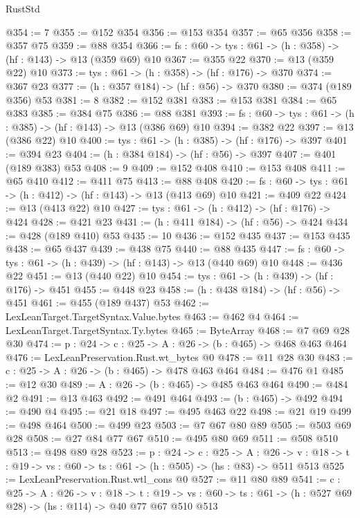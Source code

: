 \begin{lexlean}{RustStd}
\begin{coremodule}
@354 := 7
@355 := @152 @354
@356 := @153 @354
@357 := @65 @356
@358 := @357 @75
@359 := @88 @354
@366 := {fs : @60} -> {tys : @61} -> (h : @358) -> (hf : @143) -> @13 (@359 @69) @10
@367 := @355 @22
@370 := @13 (@359 @22) @10
@373 := {tys : @61} -> (h : @358) -> (hf : @176) -> @370
@374 := @367 @23
@377 := (h : @357 @184) -> (hf : @56) -> @370
@380 := @374 (@189 @356) @53
@381 := 8
@382 := @152 @381
@383 := @153 @381
@384 := @65 @383
@385 := @384 @75
@386 := @88 @381
@393 := {fs : @60} -> {tys : @61} -> (h : @385) -> (hf : @143) -> @13 (@386 @69) @10
@394 := @382 @22
@397 := @13 (@386 @22) @10
@400 := {tys : @61} -> (h : @385) -> (hf : @176) -> @397
@401 := @394 @23
@404 := (h : @384 @184) -> (hf : @56) -> @397
@407 := @401 (@189 @383) @53
@408 := 9
@409 := @152 @408
@410 := @153 @408
@411 := @65 @410
@412 := @411 @75
@413 := @88 @408
@420 := {fs : @60} -> {tys : @61} -> (h : @412) -> (hf : @143) -> @13 (@413 @69) @10
@421 := @409 @22
@424 := @13 (@413 @22) @10
@427 := {tys : @61} -> (h : @412) -> (hf : @176) -> @424
@428 := @421 @23
@431 := (h : @411 @184) -> (hf : @56) -> @424
@434 := @428 (@189 @410) @53
@435 := 10
@436 := @152 @435
@437 := @153 @435
@438 := @65 @437
@439 := @438 @75
@440 := @88 @435
@447 := {fs : @60} -> {tys : @61} -> (h : @439) -> (hf : @143) -> @13 (@440 @69) @10
@448 := @436 @22
@451 := @13 (@440 @22) @10
@454 := {tys : @61} -> (h : @439) -> (hf : @176) -> @451
@455 := @448 @23
@458 := (h : @438 @184) -> (hf : @56) -> @451
@461 := @455 (@189 @437) @53
@462 := LexLeanTarget.TargetSyntax.Value.bytes
@463 := @462 @4
@464 := LexLeanTarget.TargetSyntax.Ty.bytes
@465 := ByteArray
@468 := @7 @69 @28 @30
@474 := {p : @24} -> {c : @25} -> {A : @26} -> (b : @465) -> @468 @463 @464
@476 := LexLeanPreservation.Rust.wt_bytes @0
@478 := @11 @28 @30
@483 := {c : @25} -> {A : @26} -> (b : @465) -> @478 @463 @464
@484 := @476 @1
@485 := @12 @30
@489 := {A : @26} -> (b : @465) -> @485 @463 @464
@490 := @484 @2
@491 := @13 @463
@492 := @491 @464
@493 := (b : @465) -> @492
@494 := @490 @4
@495 := @21 @18
@497 := @495 @463 @22
@498 := @21 @19
@499 := @498 @464
@500 := @499 @23
@503 := @7 @67 @80 @89
@505 := @503 @69 @28
@508 := @27 @84 @77 @67
@510 := @495 @80 @69
@511 := @508 @510
@513 := @498 @89 @28
@523 := {p : @24} ->
  {c : @25} ->
  {A : @26} ->
  {v : @18} -> {t : @19} -> {vs : @60} -> {ts : @61} -> (h : @505) -> (hs : @83) -> @511 @513
@525 := LexLeanPreservation.Rust.wtl_cons @0
@527 := @11 @80 @89
@541 := {c : @25} ->
  {A : @26} ->
  {v : @18} ->
  {t : @19} ->
  {vs : @60} -> {ts : @61} -> (h : @527 @69 @28) -> (hs : @114) -> @40 @77 @67 @510 @513

\end{coremodule}
\end{lexlean}
